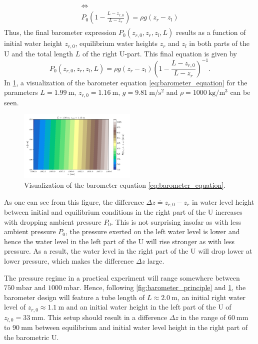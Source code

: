 \documentclass[a4paper,10pt, twocolumn]{article}
\begin{document}
\begin{gather}
\begin{gathered}
	\Leftrightarrow \\
	P_0\left(1 - \frac{L-z_{r,0}}{L-z_{r}}\right) = \rho g(z_r - z_l)
\end{gathered}
\end{gather} Thus, the final barometer expression $P_0(z_{r,0}, z_r, z_l, L)$ results as a function of initial water height $z_{r,0}$, equilibrium water heights $z_r$ and $z_l$ in both parts of the U and the total length $L$ of the right U-part. This final equation is given by \begin{equation}\label{eq:barometer_equation}
P_0(z_{r,0}, z_r, z_l, L) = \rho g(z_r-z_l)\left(1-\frac{L-z_{r,0}}{L-z_{r}}\right)^{-1}.
\end{equation}
In \cref{fig:colormap_theory}, a visualization of the barometer equation \cref{eq:barometer_equation} for the parameters $L = \SI{1.99}{\meter}$, $z_{r,0} = \SI{1.16}{\meter}$, $g = \SI{9.81}{\meter\per\second\squared}$ and $\rho = \SI{1000}{\kilogram\per\cubic\meter}$ can be seen.
\begin{figure}[h]
	\centering
	\includegraphics[width=0.5\textwidth]{figures/colormap_theory.pdf}
	\caption{Visualization of the barometer equation \cref{eq:barometer_equation}.}
	\label{fig:colormap_theory}
\end{figure}
As one can see from this figure, the difference $\Delta z \doteq z_{r,0}-z_r$ in water level height between initial and equilibrium conditions in the right part of the U increases with dropping ambient pressure $P_0$. This is not surprising insofar as with less ambient pressure $P_0$, the pressure exerted on the left water level is lower and hence the water level in the left part of the U will rise stronger as with less pressure. As a result, the water level in the right part of the U will drop lower at lower pressure, which makes the difference $\Delta z$ large.

The pressure regime in a practical experiment will range somewhere between $\SI{750}{\milli\bar}$ and $\SI{1000}{\milli\bar}$. Hence, following \cref{fig:barometer_principle} and \cref{fig:colormap_theory}, the barometer design will feature a tube length of $L \approx \SI{2.0}{\meter}$, an initial right water level of $z_{r,0} \approx \SI{1.1}{\meter}$ and an initial water height in the left part of the U of $z_{l,0} = \SI{33}{\milli\meter}$. This setup should result in a difference $\Delta z$ in the range of $\SI{60}{\milli\meter}$ to $\SI{90}{\milli\meter}$ between equilibrium and initial water level height in the right part of the barometric U.
\end{document}
